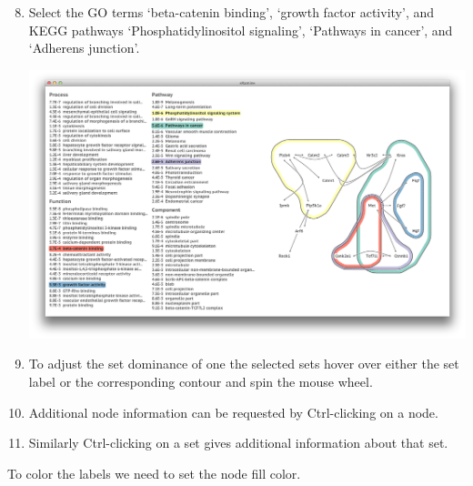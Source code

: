 \documentclass[a4paper,11pt]{article}
\begin{document}
\begin{enumerate}
  \setcounter{enumi}{7}
  \item Select the GO terms `beta-catenin binding', `growth factor
    activity', and KEGG pathways `Phosphatidylinositol signaling', `Pathways in
    cancer', and `Adherens junction'.
    \begin{center}
      \includegraphics[width=\textwidth]{images/6.png}
    \end{center}
  \item To adjust the set dominance of one the selected sets hover over either
    the set label or the corresponding contour and spin the mouse wheel.
  \item Additional node information can be requested by Ctrl-clicking on a node.
  \item Similarly Ctrl-clicking on a set gives additional information about that
    set.
\end{enumerate}

To color the labels we need to set the node fill color.
\end{document}
